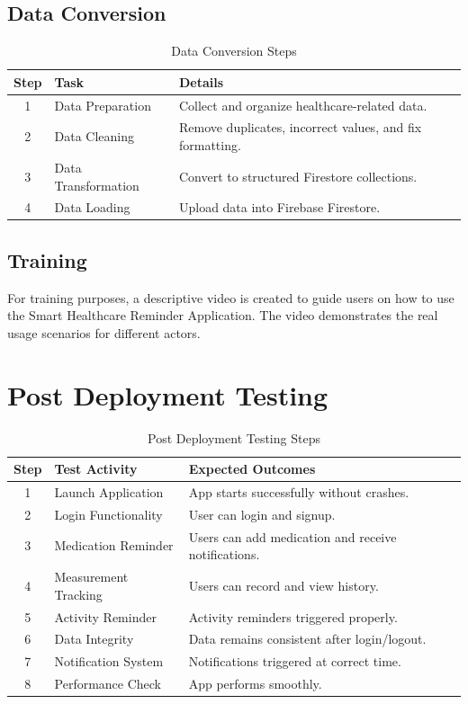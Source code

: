 \documentclass[12pt, a4paper, oneside]{report}
\begin{document}
\subsection{Data Conversion}

\begin{table}[H]
\centering
\caption{Data Conversion Steps}
\begin{tabularx}{\textwidth}{|c|l|X|}
\hline
\textbf{Step} & \textbf{Task} & \textbf{Details} \\ \hline
1 & Data Preparation & Collect and organize healthcare-related data. \\ \hline
2 & Data Cleaning & Remove duplicates, incorrect values, and fix formatting. \\ \hline
3 & Data Transformation & Convert to structured Firestore collections. \\ \hline
4 & Data Loading & Upload data into Firebase Firestore. \\ \hline
\end{tabularx}
\end{table}

\subsection{Training}
For training purposes, a descriptive video is created to guide users on how to use the Smart Healthcare Reminder Application. The video demonstrates the real usage scenarios for different actors.

\section{Post Deployment Testing}

\begin{table}[H]
\centering
\caption{Post Deployment Testing Steps}
\begin{tabularx}{\textwidth}{|c|l|X|}
\hline
\textbf{Step} & \textbf{Test Activity} & \textbf{Expected Outcomes} \\ \hline
1 & Launch Application & App starts successfully without crashes. \\ \hline
2 & Login Functionality & User can login and signup. \\ \hline
3 & Medication Reminder & Users can add medication and receive notifications. \\ \hline
4 & Measurement Tracking & Users can record and view history. \\ \hline
5 & Activity Reminder & Activity reminders triggered properly. \\ \hline
6 & Data Integrity & Data remains consistent after login/logout. \\ \hline
7 & Notification System & Notifications triggered at correct time. \\ \hline
8 & Performance Check & App performs smoothly. \\ \hline
\end{tabularx}
\end{table}
\end{document}
